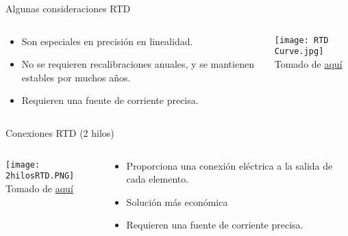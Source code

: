 \documentclass[aspectratio=169]{beamer}
\begin{document}
\begin{frame}{Algunas consideraciones RTD}
    \begin{columns}[c, onlytextwidth]
    \begin{column}{0.55\textwidth}
            \begin{itemize}
                \item Son especiales en precisión en linealidad.      
                \item No se requieren recalibraciones anuales, y se mantienen estables por muchos años. 
                \item Requieren una fuente de corriente precisa. 
            \end{itemize}
        \end{column}
        \begin{column}{0.45\textwidth}
        \texttt{[image: RTD Curve.jpg]}
            \\ \tiny{Tomado de \href{http://www.bearingsensor.com/bearing-rtd.html}{aquí}}
            
        \end{column}
        
    \end{columns}
\end{frame}
\begin{frame}{Conexiones RTD (2 hilos)}
    \begin{columns}[c, onlytextwidth]
    \begin{column}{0.50\textwidth}
        \texttt{[image: 2hilosRTD.PNG]}
            \\ \tiny{Tomado de \href{http://www.bearingsensor.com/bearing-rtd.html}{aquí}}
            
        \end{column}
    \begin{column}{0.55\textwidth}
            \begin{itemize}
                \item Proporciona una conexión eléctrica a la salida de cada elemento.     
                \item Solución más económica
                \item Requieren una fuente de corriente precisa. 
            \end{itemize}
        \end{column}
    \end{columns}
\end{frame}
\end{document}
